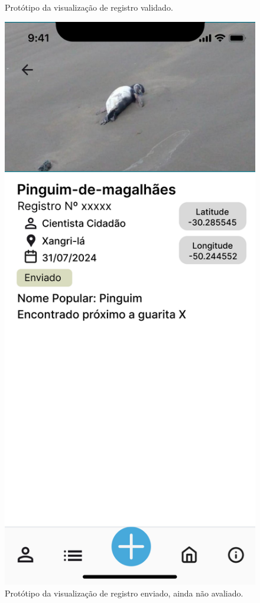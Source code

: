 \begin{figure}[H]
\begin{minipage}[b]{0.48\textwidth}
        \caption{Protótipo da visualização de registro validado.}
        \label{fig:prototipo-ver-registro-validado}
    \end{minipage}
    \hfill
    \begin{minipage}[b]{0.48\textwidth}
        \centering
        \includegraphics[height=0.6\textheight]{imagens/ve-registro-enviado-figma.png}
        \caption{Protótipo da visualização de registro enviado, ainda não avaliado.}
        \label{fig:prototipo-ver-registro-enviado}
    \end{minipage}
\end{figure}

